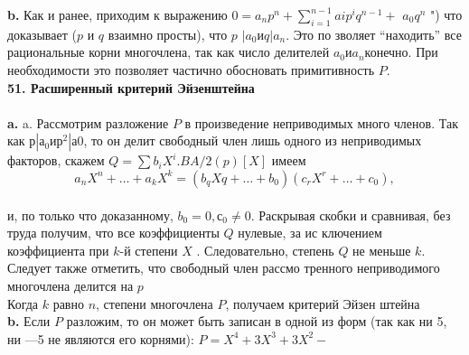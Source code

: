 \hspace*{15pt}\textbf{b.} Как и ранее, приходим к выражению $0 = a_{n}p^{n} + \sum^{n-1}_{i=1}a{i}p^{i}q^{n-1}+$\linebreak
$a_{0}q^n$ ") что доказывает ($p$ и $q$ взаимно просты), что $p$ $| a_0 и q | a_n$. Это по­\linebreak
зволяет “находить” все рациональные корни многочлена, так как число\linebreak
делителей $a_0 и a_n $конечно. При необходимости это позволяет частично\linebreak
обосновать примитивность $P$.\\
\newpage
\noindent\textbf{51. Расширенный критерий Эйзенштейна}\\
\\
\hspace*{15pt}\textbf{a.} a. Рассмотрим разложение $P$ в произведение неприводимых много­\linebreak
членов. Так как $р | а_0 и р^{2} |а0$, то он делит свободный член лишь одного\linebreak
из неприводимых факторов, скажем  $Q = \sum b_{i}X^{i}. B A/2(p)[X]$ имеем
$$a_{n}X^{n}+\ldots+a_{k}X^{k} = (b_{q}X{q}+\ldots+b_0)(c_{r}X^{r}+\ldots+c_0),$$
\\
\noindent и, по только что доказанному, $b_0 = 0, с_0 \neq 0.$ Раскрывая скобки и\linebreak
сравнивая, без труда получим, что все коэффициенты $Q$ нулевые, за ис­\linebreak
ключением коэффициента при $k$-й степени $X$ . Следовательно, степень\linebreak
$Q$ не меньше $k$. Следует также отметить, что свободный член рассмо­\linebreak
тренного неприводимого многочлена делится на $p$\\
\hspace*{0pt} Когда $k$ равно $n$, степени многочлена $P$, получаем критерий Эйзен­\linebreak
штейна\\
\hspace*{15pt}\textbf{b.} Если $P$ разложим, то он может быть записан в одной из форм\linebreak
(так как ни 5, ни —5 не являются его корнями): $P = X^{4} + 3X^{3} + 3X^{2} -$\linebreak
